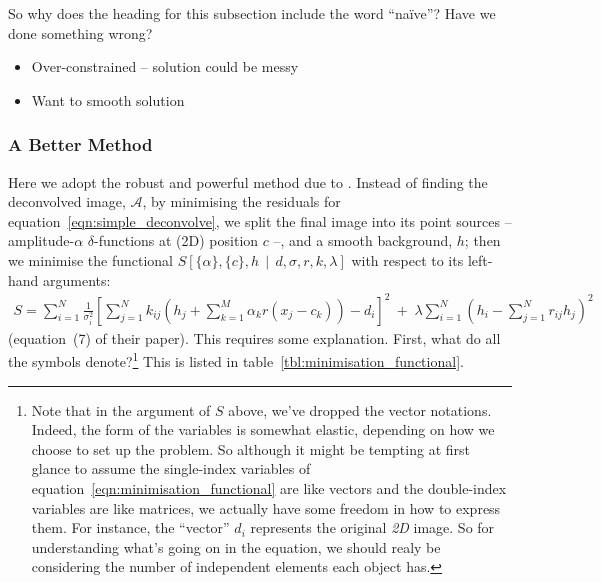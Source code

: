 \documentclass[letterpaper, 11pt]{article}
\begin{document}
So why does the heading for this subsection include the word ``na\"ive''? Have we done something wrong?
\begin{itemize}
	\item Over-constrained -- solution could be messy
	\item Want to smooth solution
\end{itemize}


\subsubsection{A Better Method}

Here we adopt the robust and powerful method due to \citet{MCS98}. Instead of finding the deconvolved image, $\mathcal A$, by minimising the residuals for equation~\ref{eqn:simple_deconvolve}, we split the final image into its point sources -- amplitude-$\alpha$ $\delta$-functions at (2D) position $c$ --, and a smooth background, $h$; then we minimise the functional $S\left[\{\alpha\},\{c\}, h \,\middle|\, {d}, {\sigma}, {r}, {k}, \lambda \right]$ with respect to its left-hand arguments:
\begin{align}
	S = \sum_{i=1}^N \frac{1}{\sigma_i^2} \left[ \sum_{j=1}^N k_{ij} \left(h_j +\sum_{k=1}^M \alpha_k r(x_j-c_k)\right) - d_i \right]^2\
			+\; \lambda\sum_{i=1}^N \left( h_i - \sum_{j=1}^N r_{ij}h_j \right)^2 \label{eqn:minimisation_functional}
\end{align}
(equation~(7) of their paper). This requires some explanation. First, what do all the symbols denote?\footnote{Note that in the argument of $S$ above, we've dropped the vector notations. Indeed, the form of the variables is somewhat elastic, depending on how we choose to set up the problem. So although it might be tempting at first glance to assume the single-index variables of equation~\ref{eqn:minimisation_functional} are like vectors and the double-index variables are like matrices, we actually have some freedom in how to express them. For instance, the ``vector'' $d_i$ represents the original \emph{2D} image. So for understanding what's going on in the equation, we should realy be considering the number of independent elements each object has.} This is listed in table~\ref{tbl:minimisation_functional}.
\end{document}
